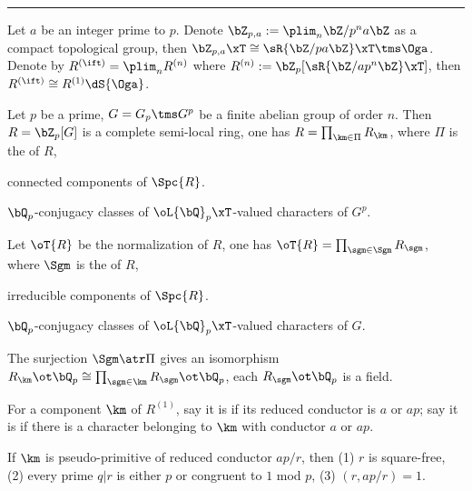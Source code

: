 \documentclass[a4paper, twoside]{article}
\begin{document}
\hrule


\begin{stp}
	Let $a$ be an integer prime to $p$. Denote $\bZ_{p,a}:=\plim_{n}\bZ/p^{n}a\bZ$ as a compact topological group, then $\bZ_{p,a}\xT\cong\sR{\bZ/pa\bZ}\xT\tms\Oga$. Denote by $R^{(\ift)}=\plim_{n}R^{(n)}$ where $R^{(n)}:=\bZ_{p}[\sR{\bZ/ap^{n}\bZ}\xT]$, then $R^{(\ift)}\cong R^{(1)}\dS{\Oga}$.
\begin{cmt}
	\begin{thm}[{\cite[Page~195]{MW1984}}]
		Let $p$ be a prime, $G=G_{p}\tms G^{p}$ be a finite abelian group of order $n$. Then $R=\bZ_{p}[G]$ is a complete semi-local ring, one has $R=\prod_{\km\in\Pi}R_{\km}$, where $\Pi$ is the  of $R$,
		\begin{itm}
			\item connected components of $\Spc{R}$.
			\item $\bQ_{p}$-conjugacy classes of $\oL{\bQ}_{p}\xT$-valued characters of $G^{p}$.
		\end{itm}
		Let $\oT{R}$ be the normalization of $R$, one has $\oT{R}=\prod_{\sgm\in\Sgm}R_{\sgm}$, where $\Sgm$ is the  of $R$,
		\begin{itm}
			\item irreducible components of $\Spc{R}$.
			\item $\bQ_{p}$-conjugacy classes of $\oL{\bQ}_{p}\xT$-valued characters of $G$.
		\end{itm}
		The surjection $\Sgm\atr\Pi$ gives an isomorphism $R_{\km}\ot\bQ_{p}\cong\prod_{\sgm\in\km}R_{\sgm}\ot\bQ_{p}$, each $R_{\sgm}\ot\bQ_{p}$ is a field.
	\end{thm}
\end{cmt}

\end{stp}

\begin{cmt}
	\begin{dfn}
		For a component $\km$ of $R^{(1)}$, say it is  if its reduced conductor is $a$ or $ap$; say it is  if there is a character belonging to $\km$ with conductor $a$ or $ap$.

		If $\km$ is pseudo-primitive of reduced conductor $ap/r$, then (1) $r$ is square-free, (2) every prime $q|r$ is either $p$ or congruent to $1$ mod $p$, (3) $(r,ap/r)=1$.
	\end{dfn}

\end{cmt}
\end{document}
